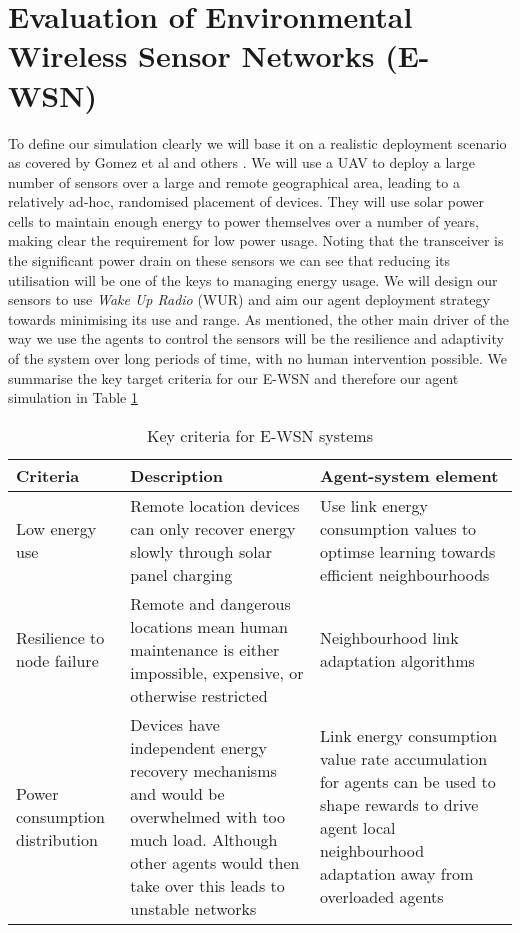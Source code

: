 \section{Evaluation of Environmental Wireless Sensor Networks (E-WSN)}
\label{section:experimental}	

To define our simulation clearly we will base it on a realistic deployment scenario as covered by Gomez et al \cite{Gomez} and others \cite{Jha2016, Avram}. We will use a UAV to deploy a large number of sensors over a large and remote geographical area, leading to a relatively ad-hoc, randomised placement of devices. They will use solar power cells to maintain enough energy to power themselves over a number of years, making clear the requirement for low power usage. Noting that the transceiver is the significant power drain on these sensors we can see that reducing its utilisation will be one of the keys to managing energy usage. We will design our sensors to use \textit{Wake Up Radio} (WUR) and aim our agent deployment strategy towards minimising its use and range. As mentioned, the other main driver of the way we use the agents to control the sensors will be the resilience and adaptivity of the system over long periods of time, with no human intervention possible.  We summarise the key target criteria for our E-WSN and therefore our agent simulation in Table \ref {table:real_world_systems_criteria} 
\begin{table}
	\begin{tabular}{p{}p{} p{}}
		\hline
		\textbf{Criteria} & \textbf{Description} & \textbf{Agent-system element} \\
		\hline
		Low energy use & Remote location devices can only recover energy slowly through solar panel charging &  Use link energy consumption values to optimse learning towards efficient neighbourhoods \\
		Resilience to node failure & Remote and dangerous locations mean human maintenance is either impossible, expensive, or otherwise restricted & Neighbourhood link adaptation algorithms \\	
		Power consumption distribution & Devices have independent energy recovery mechanisms and would be overwhelmed with too much load. Although other agents would then take over this leads to unstable networks & Link energy consumption value rate accumulation for agents can be used to shape rewards to drive agent local neighbourhood adaptation away from overloaded agents  \\ 
		\hline
	\end{tabular}
	\caption{Key criteria for E-WSN systems}
	\label{table:real_world_systems_criteria}
\end{table}

